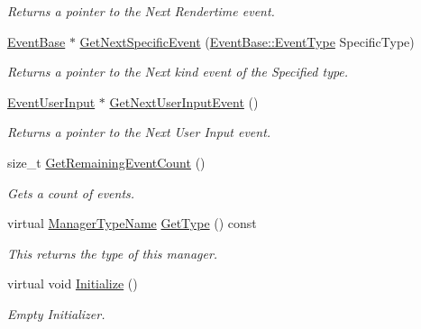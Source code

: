 \begin{DoxyCompactItemize}
\begin{DoxyCompactList}\small\item\em Returns a pointer to the Next Rendertime event. \item\end{DoxyCompactList}\item 
\hyperlink{classMezzanine_1_1EventBase}{EventBase} $\ast$ \hyperlink{classMezzanine_1_1EventManager_a1ef3a915c26ab96fa6958a9e80c8aaaa}{GetNextSpecificEvent} (\hyperlink{classMezzanine_1_1EventBase_ab85e31e97753b7e7ecb098f82526baef}{EventBase::EventType} SpecificType)
\begin{DoxyCompactList}\small\item\em Returns a pointer to the Next kind event of the Specified type. \item\end{DoxyCompactList}\item 
\hyperlink{classMezzanine_1_1EventUserInput}{EventUserInput} $\ast$ \hyperlink{classMezzanine_1_1EventManager_a8d1af0c4bcb070edb8d013e1cf9ebf34}{GetNextUserInputEvent} ()
\begin{DoxyCompactList}\small\item\em Returns a pointer to the Next User Input event. \item\end{DoxyCompactList}\item 
size\_\-t \hyperlink{classMezzanine_1_1EventManager_aa3f1b41578307c7ac801340b275af027}{GetRemainingEventCount} ()
\begin{DoxyCompactList}\small\item\em Gets a count of events. \item\end{DoxyCompactList}\item 
virtual \hyperlink{classMezzanine_1_1ManagerBase_a08cecf5169cad3e82be81a3a159b0b6e}{ManagerTypeName} \hyperlink{classMezzanine_1_1EventManager_a6e4c72bcaa437863fdf167b5b9ef5034}{GetType} () const 
\begin{DoxyCompactList}\small\item\em This returns the type of this manager. \item\end{DoxyCompactList}\item 
virtual void \hyperlink{classMezzanine_1_1EventManager_a2bf1969aadd0fb5a3da284423e44b081}{Initialize} ()
\begin{DoxyCompactList}\small\item\em Empty Initializer. \item\end{DoxyCompactList}\item 

\end{DoxyCompactItemize}

